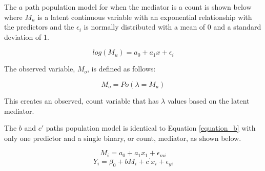 \documentclass[]{article}
\begin{document}
The \(a\) path population model for when the mediator is a count is
shown below where \(M_u\) is a latent continuous variable with an
exponential relationship with the predictors and the \(\epsilon_i\) is
normally distributed with a mean of 0 and a standard deviation of 1.

\begin{equation}
log(M_u) = a_0 + a_1 x + \epsilon_i
\end{equation}

\noindent The observed variable, \(M_{o}\), is defined as follows:

\begin{equation}
M_{o} = Po(\lambda = M_u)
\end{equation}

\noindent This creates an observed, count variable that has \(\lambda\)
values based on the latent mediator.

The \(b\) and \(c'\) paths population model is identical to Equation
\ref{equation_b} with only one predictor and a single binary, or count,
mediator, as shown below.

\begin{equation}
M_{i} = a_0 + a_1 x_1 + \epsilon_{mi}
\end{equation}\begin{equation}
Y_{i} = \beta_0 + b M_{i} + c^{'} x_{i} + \epsilon_{yi}
\end{equation}
\end{document}
